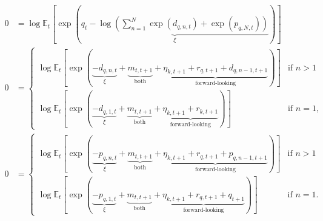 \documentclass[12 pt, oneside]{article}
\theoremstyle{definition}
\theoremstyle{definition}
\theoremstyle{definition}
\newcommand{\E}{\mathbb{E}}
\begin{document}
\begin{align}
  0 & = \log\E_t\left[\exp\left(\underbrace{q_t - \log\left(\sum_{n = 1}^{N}\exp(d_{q, n, t}) + \exp(p_{q, N, t})\right)}_{\xi}\right)\right]\\
  0 & =
      \begin{cases}
        \log\E_t\left[\exp\left(\underbrace{-d_{q, n, t}}_{\xi} + \underbrace{m_{t, t + 1}}_{\text{both}} + \underbrace{\eta_{k, t + 1} + r_{q, t + 1} + d_{q, n - 1, t + 1}}_{\text{forward-looking}}\right)\right] & \text{if } n > 1\\
        \log\E_t\left[\exp\left(\underbrace{- d_{q, 1, t}}_{\xi} + \underbrace{m_{t, t + 1}}_{\text{both}} + \underbrace{\eta_{k, t + 1} + r_{k, t + 1}}_{\text{forward-looking}} \right)\right] & \text{if } n = 1,
      \end{cases}\\
  0 & =
      \begin{cases}
        \log\E_t\left[\exp\left(\underbrace{-p_{q, n, t}}_{\xi} + \underbrace{m_{t, t + 1}}_{\text{both}} + \underbrace{\eta_{k, t + 1} + r_{q, t + 1} + p_{q, n - 1, t + 1}}_{\text{forward-looking}} \right)\right] & \text{if } n > 1\\
        \log\E_t\left[\exp\left(\underbrace{-p_{q, 1, t}}_{\xi} + \underbrace{m_{t, t + 1}}_{\text{both}} + \underbrace{\eta_{k, t + 1} + r_{q, t + 1} + q_{t + 1}}_{\text{forward-looking}}\right)\right] & \text{if }n = 1.
      \end{cases}
\end{align}
\end{document}
